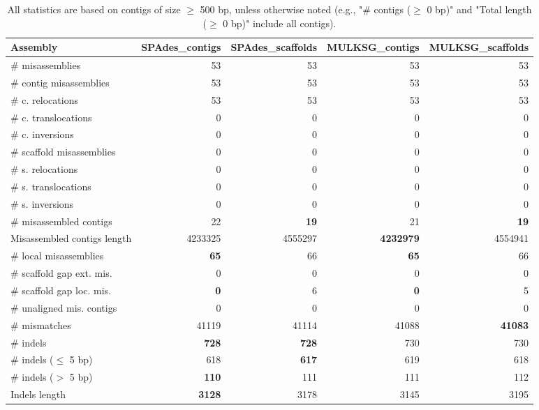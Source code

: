 \documentclass[12pt,a4paper]{article}
\begin{document}
\begin{table}[ht]
\begin{center}
\caption{All statistics are based on contigs of size $\geq$ 500 bp, unless otherwise noted (e.g., "\# contigs ($\geq$ 0 bp)" and "Total length ($\geq$ 0 bp)" include all contigs).}
\begin{tabular}{|l*{4}{|r}|}
\hline
Assembly & SPAdes\_contigs & SPAdes\_scaffolds & MULKSG\_contigs & MULKSG\_scaffolds \\ \hline
\# misassemblies & 53 & 53 & 53 & 53 \\ \hline
\hspace{2mm}\# contig misassemblies & 53 & 53 & 53 & 53 \\ \hline
\hspace{5mm}\# c. relocations & 53 & 53 & 53 & 53 \\ \hline
\hspace{5mm}\# c. translocations & 0 & 0 & 0 & 0 \\ \hline
\hspace{5mm}\# c. inversions & 0 & 0 & 0 & 0 \\ \hline
\hspace{2mm}\# scaffold misassemblies & 0 & 0 & 0 & 0 \\ \hline
\hspace{5mm}\# s. relocations & 0 & 0 & 0 & 0 \\ \hline
\hspace{5mm}\# s. translocations & 0 & 0 & 0 & 0 \\ \hline
\hspace{5mm}\# s. inversions & 0 & 0 & 0 & 0 \\ \hline
\# misassembled contigs & 22 & {\bf 19} & 21 & {\bf 19} \\ \hline
Misassembled contigs length & 4233325 & 4555297 & {\bf 4232979} & 4554941 \\ \hline
\# local misassemblies & {\bf 65} & 66 & {\bf 65} & 66 \\ \hline
\# scaffold gap ext. mis. & 0 & 0 & 0 & 0 \\ \hline
\# scaffold gap loc. mis. & {\bf 0} & 6 & {\bf 0} & 5 \\ \hline
\# unaligned mis. contigs & 0 & 0 & 0 & 0 \\ \hline
\# mismatches & 41119 & 41114 & 41088 & {\bf 41083} \\ \hline
\# indels & {\bf 728} & {\bf 728} & 730 & 730 \\ \hline
\hspace{5mm}\# indels ($\leq$ 5 bp) & 618 & {\bf 617} & 619 & 618 \\ \hline
\hspace{5mm}\# indels ($>$ 5 bp) & {\bf 110} & 111 & 111 & 112 \\ \hline
Indels length & {\bf 3128} & 3178 & 3145 & 3195 \\ \hline
\end{tabular}
\end{center}
\end{table}
\end{document}
